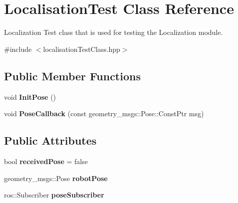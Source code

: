 \hypertarget{classLocalisationTest}{}\section{Localisation\+Test Class Reference}
\label{classLocalisationTest}


Localization Test class that is used for testing the Localization module.  




{\ttfamily \#include $<$localisation\+Test\+Class.\+hpp$>$}

\subsection*{Public Member Functions}
\begin{DoxyCompactItemize}
\item 
void {\bfseries Init\+Pose} ()\hypertarget{classLocalisationTest_ae330b6bca3f5fc5f6f4aaf25f2a9a43d}{}\label{classLocalisationTest_ae330b6bca3f5fc5f6f4aaf25f2a9a43d}

\item 
void {\bfseries Pose\+Callback} (const geometry\+\_\+msgs\+::\+Pose\+::\+Const\+Ptr msg)\hypertarget{classLocalisationTest_a679d07e6bc1c6215907dcf073d8e2922}{}\label{classLocalisationTest_a679d07e6bc1c6215907dcf073d8e2922}

\end{DoxyCompactItemize}
\subsection*{Public Attributes}
\begin{DoxyCompactItemize}
\item 
bool {\bfseries received\+Pose} = false\hypertarget{classLocalisationTest_a491f5a00d728c5b46492f959c7dda209}{}\label{classLocalisationTest_a491f5a00d728c5b46492f959c7dda209}

\item 
geometry\+\_\+msgs\+::\+Pose {\bfseries robot\+Pose}\hypertarget{classLocalisationTest_aea195b6f883a3aba0d94b620668c3f93}{}\label{classLocalisationTest_aea195b6f883a3aba0d94b620668c3f93}

\item 
ros\+::\+Subscriber {\bfseries pose\+Subscriber}\hypertarget{classLocalisationTest_ab107d52bf708a394c250c1c4c4920cee}{}\label{classLocalisationTest_ab107d52bf708a394c250c1c4c4920cee}

\end{DoxyCompactItemize}



